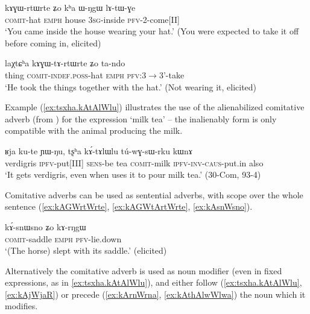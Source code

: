 \begin{exe}
\ex \label{ex:kAGWrtWrte}
\gll kɤɣɯ-rtɯ\tld{}rte 	ʑo 	kʰa	ɯ-ŋgɯ	lɤ-tɯ-ɣe	\\
\textsc{comit}-hat \textsc{emph} house \textsc{3sg}-inside \textsc{pfv}-2-come[II] \\
\glt `You came inside the house wearing your hat.' (You were expected to take it off before coming in, elicited)
\end{exe}

\begin{exe}
\ex \label{ex:kAGWtArtWrte}
\gll  laχtɕʰa	kɤɣɯ-tɤ-rtɯ\redp{}rte	ʑo	ta-ndo \\
thing \textsc{comit-indef.poss}-hat \textsc{emph} \textsc{pfv}:3$\rightarrow$3'-take \\
\glt `He took the things together with the hat.' (Not wearing it, elicited)
\end{exe}

Example (\ref{ex:tsxha.kAtAlWlu}) illustrates the use of the alienabilized comitative adverb  (from ) for the expression `milk tea' -- the inalienably form  is only compatible with the animal producing the milk.

\begin{exe}
\ex \label{ex:tsxha.kAtAlWlu}
\gll   ʁja ku-te ɲɯ-ŋu, tʂʰa kɤ́-tɤlɯ\redp{}lu tú-wɣ-sɯ-rku kɯnɤ \\
verdigris \textsc{ipfv}-put[III] \textsc{sens}-be tea \textsc{comit}-milk \textsc{ipfv}-\textsc{inv}-\textsc{caus}-put.in also \\
\glt  `It gets verdigris, even when uses it to pour milk tea.'  (30-Com, 93-4)
\end{exe}

Comitative adverbs can be used as sentential adverbs, with scope over the whole sentence (\ref{ex:kAGWrtWrte}, \ref{ex:kAGWtArtWrte}, \ref{ex:kAsnWsno}). 

\begin{exe}
\ex \label{ex:kAsnWsno}
\gll kɤ́-snɯ\tld{}sno 	ʑo 	kɤ-rŋgɯ \\
\textsc{comit}-saddle \textsc{emph} \textsc{pfv}-lie.down \\
\glt `(The horse) slept with its saddle.' (elicited)
\end{exe}

Alternatively the comitative adverb is used as noun modifier (even in fixed expressions, as in \ref{ex:tsxha.kAtAlWlu}), and either follow (\ref{ex:tsxha.kAtAlWlu}, \ref{ex:kAjWjaR}) or precede (\ref{ex:kArnWrna}, \ref{ex:kAthAlwWlwa}) the noun which it modifies.

